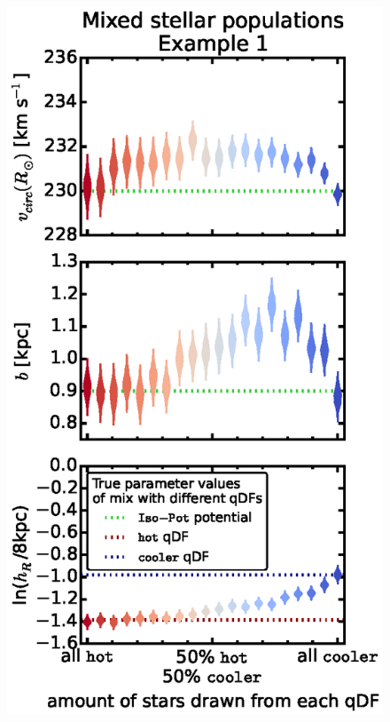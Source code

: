 


\begin{figure}[!htbp]
\centering
\includegraphics[scale=0.45]{figs/isoSphFlexMixCont_violins_2.eps}

\end{figure}
